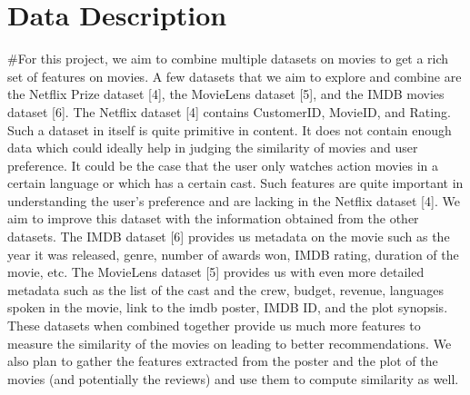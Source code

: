 \documentclass{article}
\begin{document}
\section{Data Description}
#For this project, we aim to combine multiple datasets on movies to get a rich set of features on movies. A few datasets that we aim to explore and combine are the Netflix Prize dataset [4], the MovieLens dataset [5], and the IMDB movies dataset [6]. The Netflix dataset [4] contains CustomerID, MovieID, and Rating. Such a dataset in itself is quite primitive in content. It does not contain enough data which could ideally help in judging the similarity of movies and user preference. It could be the case that the user only watches action movies in a certain language or which has a certain cast. Such features are quite important in understanding the user’s preference and are lacking in the Netflix dataset [4].  We aim to improve  this dataset with the information obtained from the other datasets. The IMDB dataset [6] provides us metadata on the movie such as the year it was released, genre, number of awards won, IMDB rating, duration of the movie, etc. The MovieLens dataset [5] provides us with even more detailed metadata such as the list of the cast and the crew, budget, revenue, languages spoken in the movie, link to the imdb poster, IMDB ID, and the plot synopsis. These datasets when combined together provide us much more features to measure the similarity of the movies on leading to better recommendations. We also plan to gather the features extracted from the poster and the plot of the movies (and potentially the reviews) and use them to compute similarity as well. 
\end{document}
